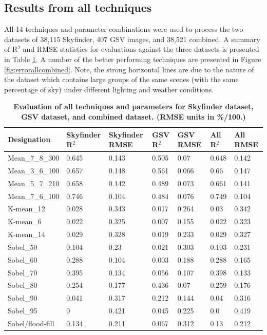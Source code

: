 \documentclass[final,3p,times,authoryear]{elsarticle}
\begin{document}
\subsection{Results from all techniques}\label{sec:resultsall}
All 14 techniques and parameter combinations were used to process the two datasets of 38,115 Skyfinder, 407 GSV images, and 38,521 combined. A summary of R$^{2}$ and RMSE statistics for evaluations against the three datasets is presented in Table \ref{tab:evalall}. A number of the better performing techniques are presented in Figure \ref{fig:errorallcombined}. Note, the strong horizontal lines are due to the nature of the dataset which contains large groups of the same scenes (with the same percentage of sky) under different lighting and weather conditions.

\begin{table}[!htbp]
\caption{\bf Evaluation of all techniques and parameters for Skyfinder dataset, GSV dataset, and combined dataset. (RMSE units in \%/100.) \label{tab:evalall}}     
\begin{tabular}{ l  l l l l l l}
\textbf{Designation}  & \textbf{Skyfinder R$^{2}$} & \textbf{Skyfinder RMSE} & \textbf{GSV R$^{2}$} & \textbf{GSV RMSE} & \textbf{All R$^{2}$} & \textbf{All RMSE} \\ \hline
Mean\_7\_8\_300 &0.645&0.143&0.505&0.07&0.648&0.142 \\
Mean\_3\_6\_100	&0.657&0.148&0.561&0.066&0.66&0.147 \\
Mean\_5\_7\_210	&0.658&0.142&0.489&0.073&0.661&0.141 \\
Mean\_7\_6\_100	&0.746&0.104&0.484&0.076&0.749&0.104 \\
K-mean\_12 &0.028&0.343&0.017&0.264&0.03&0.342 \\
K-mean\_6 &0.022&0.325&0.007&0.155&0.022&0.323 \\
K-mean\_14 &0.029&0.328&0.019&0.233&0.029&0.327 \\
Sobel\_50 &0.104&0.23&0.021&0.303&0.103&0.231 \\
Sobel\_60 &0.288&0.104&0.003&0.188&0.288&0.165 \\
Sobel\_70 &0.395&0.134&0.056&0.107&0.398&0.133 \\
Sobel\_80 &0.254&0.177&0.436&0.07&0.259&0.176 \\
Sobel\_90 &0.041&0.317&0.212&0.144&0.04&0.316 \\
Sobel\_95 &0&0.421&0.045&0.225&0.0&0.419 \\
Sobel/flood-fill &0.134&0.211&0.067&0.312&0.13&0.212 \\
\hline
\end{tabular}
\end{table}
\end{document}
